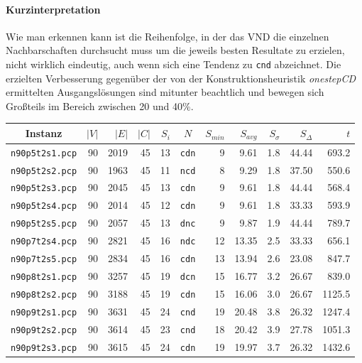 \documentclass[paper=a4,fontsize=12pt]{scrartcl}
\begin{document}
\paragraph{Kurzinterpretation}{
Wie man erkennen kann ist die Reihenfolge, in der das VND die einzelnen Nachbarschaften durchsucht muss um die jeweils besten Resultate zu erzielen, nicht wirklich eindeutig, auch wenn sich eine Tendenz zu \texttt{cnd} abzeichnet. Die erzielten Verbesserung gegenüber der von der Konstruktionsheuristik \emph{onestepCD} ermittelten Ausgangslösungen sind mitunter beachtlich und bewegen sich Großteils im Bereich zwischen 20 und 40\%.}

\begin{table}[!htbp]
\centering
\begin{tabular}{c|rrr|r|c|rrr|r|r}
Instanz & $|V|$ & $|E|$ & $|C|$ & $S_i$ & $N$ & $S_{min}$ & $S_{avg}$ & $S_{\sigma}$ & $S_{\Delta}$ & $t$ \\
\hline\hline
\texttt{n90p5t2s1.pcp} & 90	& 2019	& 45 & 13 & \texttt{cdn} & 9 & 9.61 & 1.8 & 44.44 & 693.2\\
\texttt{n90p5t2s2.pcp} & 90	& 1963	& 45 & 11 & \texttt{ncd} & 8 & 9.29 & 1.8 & 37.50 & 550.6\\
\texttt{n90p5t2s3.pcp} & 90	& 2045	& 45 & 13 & \texttt{cdn} & 9 & 9.61 & 1.8 & 44.44 & 568.4\\
\texttt{n90p5t2s4.pcp} & 90	& 2014	& 45 & 12 & \texttt{cdn} & 9 & 9.61 & 1.8 & 33.33 & 593.9\\
\texttt{n90p5t2s5.pcp} & 90	& 2057	& 45 & 13 & \texttt{dnc} & 9 & 9.87 & 1.9 & 44.44 & 789.7\\
\texttt{n90p7t2s4.pcp} & 90	& 2821	& 45 & 16 & \texttt{ndc} & 12 & 13.35 & 2.5 & 33.33 & 656.1\\
\texttt{n90p7t2s5.pcp} & 90	& 2834	& 45 & 16 & \texttt{cdn} & 13 & 13.94 & 2.6 & 23.08 & 847.7\\
\texttt{n90p8t2s1.pcp} & 90	& 3257	& 45 & 19 & \texttt{dcn} & 15 & 16.77 & 3.2 & 26.67 & 839.0\\
\texttt{n90p8t2s2.pcp} & 90	& 3188	& 45 & 19 & \texttt{cdn} & 15 & 16.06 & 3.0 & 26.67 & 1125.5\\
\texttt{n90p9t2s1.pcp} & 90	& 3631	& 45	& 24 & \texttt{cnd} & 19 & 20.48 & 3.8 & 26.32 & 1247.4\\
\texttt{n90p9t2s2.pcp} & 90	& 3614	& 45	& 23 & \texttt{cnd} & 18 & 20.42 & 3.9 & 27.78 & 1051.3\\
\texttt{n90p9t2s3.pcp} & 90	& 3615	& 45	& 24 & \texttt{cdn} & 19 & 19.97 & 3.7 & 26.32 & 1432.6\\

\end{tabular}
\end{table}
\end{document}
